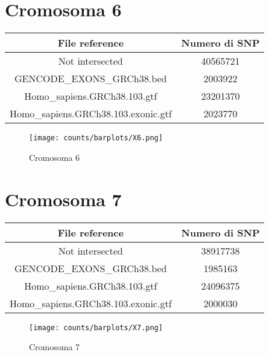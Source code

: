 \section*{Cromosoma 6}
  \begin{table}[H]\centering
	\begin{tabular}{|c|c|}
	  \hline
	  File reference & Numero di SNP \\
		\hline
		Not intersected & 40565721 \\
	  \hline
	  GENCODE\_EXONS\_GRCh38.bed & 2003922 \\
	  \hline
	  Homo\_sapiens.GRCh38.103.gtf & 23201370 \\
	  \hline
	  Homo\_sapiens.GRCh38.103.exonic.gtf & 2023770 \\
	  \hline
	\end{tabular}
  \end{table}
  \begin{figure}[H]
	\texttt{[image: counts/barplots/X6.png]}
	\caption{Cromosoma 6}
	\label{fig:chr6}
  \end{figure}

\section*{Cromosoma 7}
  \begin{table}[H]\centering
	\begin{tabular}{|c|c|}
	  \hline
	  File reference & Numero di SNP \\
		\hline
		Not intersected & 38917738 \\
	  \hline
	  GENCODE\_EXONS\_GRCh38.bed & 1985163 \\
	  \hline
	  Homo\_sapiens.GRCh38.103.gtf & 24096375 \\
	  \hline
	  Homo\_sapiens.GRCh38.103.exonic.gtf & 2000030 \\
	  \hline
	\end{tabular}
  \end{table}
  \begin{figure}[H]
	\texttt{[image: counts/barplots/X7.png]}
	\caption{Cromosoma 7}
	\label{fig:chr7}
  \end{figure}

